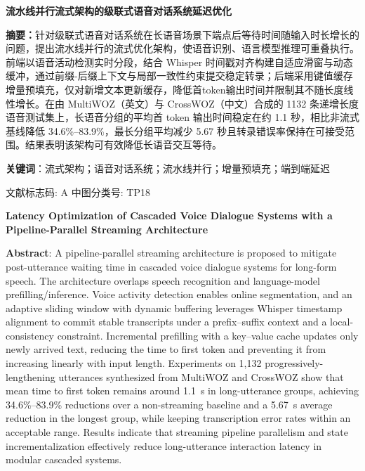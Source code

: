 \documentclass[UTF8,a4paper,zihao=5]{ctexart}
\begin{document}
\begin{center}
{\Large\bfseries 流水线并行流式架构的级联式语音对话系统延迟优化}
\end{center}

\noindent\textbf{摘\quad 要：}针对级联式语音对话系统在长语音场景下端点后等待时间随输入时长增长的问题，提出流水线并行的流式优化架构，使语音识别、语言模型推理可重叠执行。前端以语音活动检测实时分段，结合 Whisper 时间戳对齐构建自适应滑窗与动态缓冲，通过前缀-后缀上下文与局部一致性约束提交稳定转录；后端采用键值缓存增量预填充，仅对新增文本更新缓存，降低首token输出时间并限制其不随长度线性增长。在由 MultiWOZ（英文）与 CrossWOZ（中文）合成的 1132 条递增长度语音测试集上，长语音分组的平均首 token 输出时间稳定在约 1.1 秒，相比非流式基线降低 34.6\%--83.9\%，最长分组平均减少 5.67 秒且转录错误率保持在可接受范围。结果表明该架构可有效降低长语音交互等待。

\noindent\textbf{关键词}：流式架构；语音对话系统；流水线并行；增量预填充；端到端延迟

\noindent 文献标志码: A \quad 中图分类号: TP18

\begin{center}
\textbf{Latency Optimization of Cascaded Voice Dialogue Systems with a Pipeline-Parallel Streaming Architecture}
\end{center}

\noindent\textbf{Abstract}: A pipeline-parallel streaming architecture is proposed to mitigate post-utterance waiting time in cascaded voice dialogue systems for long-form speech. The architecture overlaps speech recognition and language-model prefilling/inference. Voice activity detection enables online segmentation, and an adaptive sliding window with dynamic buffering leverages Whisper timestamp alignment to commit stable transcripts under a prefix--suffix context and a local-consistency constraint. Incremental prefilling with a key--value cache updates only newly arrived text, reducing the time to first token and preventing it from increasing linearly with input length. Experiments on 1,132 progressively-lengthening utterances synthesized from MultiWOZ and CrossWOZ show that mean time to first token remains around 1.1~s in long-utterance groups, achieving 34.6\%--83.9\% reductions over a non-streaming baseline and a 5.67~s average reduction in the longest group, while keeping transcription error rates within an acceptable range. Results indicate that streaming pipeline parallelism and state incrementalization effectively reduce long-utterance interaction latency in modular cascaded systems.
\end{document}
